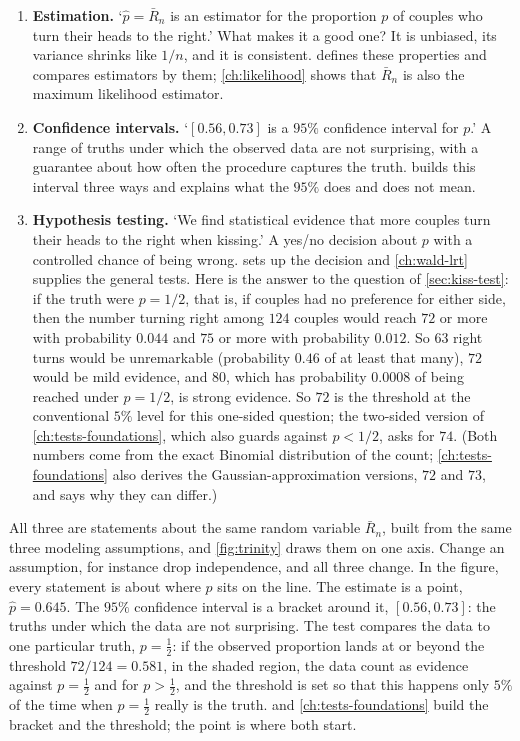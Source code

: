 \begin{enumerate}
\item \textbf{Estimation.} `$\hat{p} = \bar{R}_n$ is an estimator for the proportion $p$ of couples who turn their heads to the right.'
What makes it a good one? It is unbiased, its variance shrinks like $1/n$, and it is consistent.
 defines these properties and compares estimators by them; \cref{ch:likelihood} shows that $\bar{R}_n$ is also the maximum likelihood estimator.

\item \textbf{Confidence intervals.} `$[0.56, 0.73]$ is a $95\%$ confidence interval for $p$.'
A range of truths under which the observed data are not surprising, with a guarantee about how often the procedure captures the truth.
 builds this interval three ways and explains what the $95\%$ does and does not mean.

\item \textbf{Hypothesis testing.} `We find statistical evidence that more couples turn their heads to the right when kissing.'
A yes/no decision about $p$ with a controlled chance of being wrong.
 sets up the decision and \cref{ch:wald-lrt} supplies the general tests.
Here is the answer to the question of \cref{sec:kiss-test}: if the truth were $p = 1/2$, that is, if couples had no preference for either side, then the number turning right among $124$ couples would reach $72$ or more with probability $0.044$ and $75$ or more with probability $0.012$.
So $63$ right turns would be unremarkable (probability $0.46$ of at least that many), $72$ would be mild evidence, and $80$, which has probability $0.0008$ of being reached under $p = 1/2$, is strong evidence.
So $72$ is the threshold at the conventional $5\%$ level for this one-sided question; the two-sided version of \cref{ch:tests-foundations}, which also guards against $p < 1/2$, asks for $74$.
(Both numbers come from the exact Binomial distribution of the count; \cref{ch:tests-foundations} also derives the Gaussian-approximation versions, $72$ and $73$, and says why they can differ.)
\end{enumerate}

All three are statements about the same random variable $\bar{R}_n$, built from the same three modeling assumptions, and \cref{fig:trinity} draws them on one axis.
Change an assumption, for instance drop independence, and all three change.
In the figure, every statement is about where $p$ sits on the line.
The estimate is a point, $\hat{p} = 0.645$.
The $95\%$ confidence interval is a bracket around it, $[0.56, 0.73]$: the truths under which the data are not surprising.
The test compares the data to one particular truth, $p = \frac12$: if the observed proportion lands at or beyond the threshold $72/124 = 0.581$, in the shaded region, the data count as evidence against $p = \frac12$ and for $p > \frac12$, and the threshold is set so that this happens only $5\%$ of the time when $p = \frac12$ really is the truth.
 and \cref{ch:tests-foundations} build the bracket and the threshold; the point is where both start.


